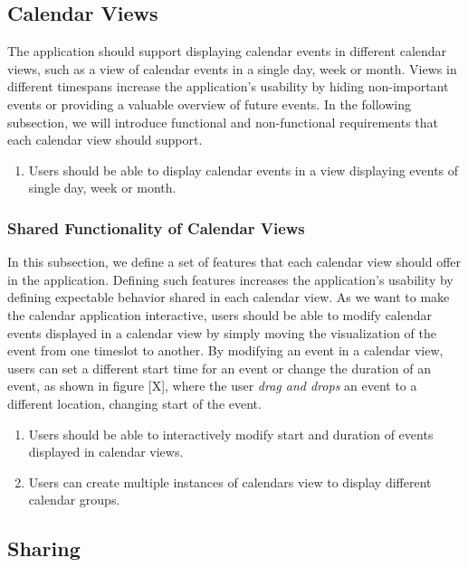 \subsection*{Calendar Views}
The application should support displaying calendar events in different calendar views, such as a view of calendar events in a single day, week or month. Views in different timespans increase the application's usability by hiding non-important events or providing a valuable overview of future events.
In the following subsection, we will introduce functional and non-functional requirements that each calendar view should support.

\begin{enumerate}[label=\color{reqcolor}\textbf{R{\arabic*}}, resume]
    \item \label{app:req:views0} Users should be able to display calendar events in a view displaying events of single day, week or month.
\end{enumerate}

\subsubsection*{Shared Functionality of Calendar Views}
In this subsection, we define a set of features that each calendar view should offer in the application. Defining such features increases the application's usability by defining expectable behavior shared in each calendar view.
As we want to make the calendar application interactive, users should be able to modify calendar events displayed in a calendar view by simply moving the visualization of the event from one timeslot to another. By modifying an event in a calendar view, users can set a different start time for an event or change the duration of an event, as shown in figure [X], where the user \textit{drag and drops} an event to a different location, changing start of the event.

\begin{enumerate}[label=\color{reqcolor}\textbf{R{\arabic*}}, resume]
    \item \label{app:req:views1} Users should be able to interactively modify start and duration of events displayed in calendar views.
    \item \label{app:req:views2} Users can create multiple instances of calendars view to display different calendar groups.
\end{enumerate}

\subsection*{Sharing}

